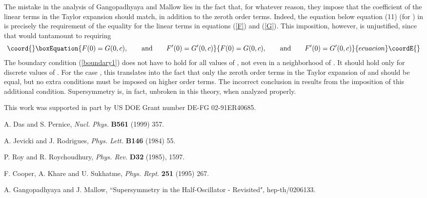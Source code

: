 \documentclass[a4paper,amssymb,aps]{revtex4}
\begin{document}
The mistake in the analysis of Gangopadhyaya and Mallow lies in the
fact that,  for
whatever reason, they impose that the 
coefficient of the linear terms in the Taylor expansion should match, in
addition  to the zeroth order terms. Indeed, 
the equation below equation (11) (for \coordHE{}) in \cite{asim} is
precisely the requirement of the equality for the linear terms in
equations (\ref{F}) 
and (\ref{G}). This imposition, however, is unjustified, since that
would tantamount to requiring
\begin{equation}\coord{}\boxEquation{
F(0)=G(0,c),\qquad {\rm and}\qquad  F'(0)=G'(0,c)
}{
F(0)=G(0,c),\qquad {\rm and}\qquad  F'(0)=G'(0,c)
}{ecuacion}\coordE{}\end{equation}
The boundary condition (\ref{boundary1}) does not have to hold for all
values of 
\myHighlight{$\epsilon$}\coordHE{}, not even in a neighborhood of \coordHE{}. It should 
hold only  for discrete values of
\myHighlight{$\epsilon$}\coordHE{}.  For the case \coordHE{}, this translates into the fact
that only the
zeroth order terms in the Taylor expansion of \coordHE{} and \coordHE{} should
be equal, but no extra conditions must be imposed on higher order
terms. The incorrect conclusion in \cite{asim} results from the
imposition of this additional condition. Supersymmetry is, in fact,
unbroken in this theory, when analyzed properly.
\vspace{1cm}


This work was supported in part by US DOE Grant number DE-FG 02-91ER40685.


\begin{thebibliography}{99}

 A. Das and S. Pernice, {\it Nucl. Phys.} {\bf B561} (1999) 357.

 A. Jevicki and J. Rodrigues, {\it Phys. Lett.} {\bf
B146} (1984) 55.

  P. Roy and R. Roychoudhury, {\it Phys. Rev.} {\bf D32} (1985),
1597.

 F. Cooper, A. Khare and U. Sukhatme, {\it
Phys. Rept.} {\bf 251} (1995) 267.

 A. Gangopadhyaya and J. Mallow, ``Supersymmetry in the
Half-Oscillator - Revisited", hep-th/0206133.


\end{thebibliography}  
\end{document}
